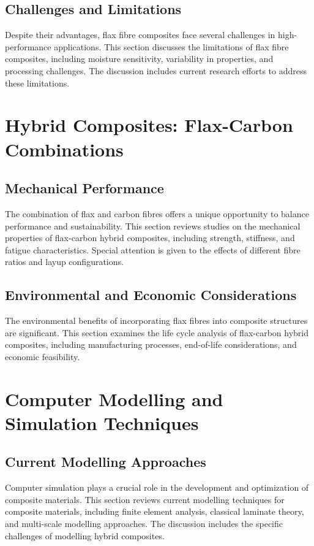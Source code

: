 \documentclass[11pt,twocolumn]{article}
\begin{document}
\subsection{Challenges and Limitations}
Despite their advantages, flax fibre composites face several challenges in high-performance applications. This section discusses the limitations of flax fibre composites, including moisture sensitivity, variability in properties, and processing challenges. The discussion includes current research efforts to address these limitations.

\section{Hybrid Composites: Flax-Carbon Combinations}
\subsection{Mechanical Performance}
The combination of flax and carbon fibres offers a unique opportunity to balance performance and sustainability. This section reviews studies on the mechanical properties of flax-carbon hybrid composites, including strength, stiffness, and fatigue characteristics. Special attention is given to the effects of different fibre ratios and layup configurations.

\subsection{Environmental and Economic Considerations}
The environmental benefits of incorporating flax fibres into composite structures are significant. This section examines the life cycle analysis of flax-carbon hybrid composites, including manufacturing processes, end-of-life considerations, and economic feasibility.

\section{Computer Modelling and Simulation Techniques}
\subsection{Current Modelling Approaches}
Computer simulation plays a crucial role in the development and optimization of composite materials. This section reviews current modelling techniques for composite materials, including finite element analysis, classical laminate theory, and multi-scale modelling approaches. The discussion includes the specific challenges of modelling hybrid composites.
\end{document}
